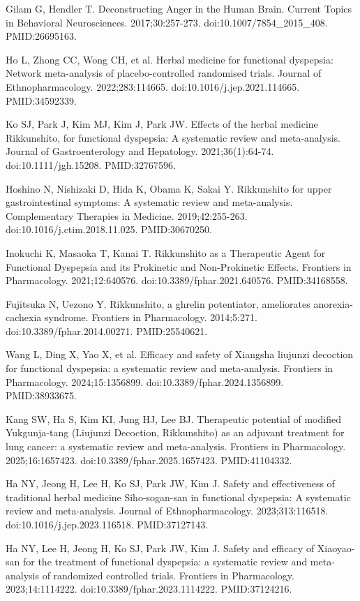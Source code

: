 \documentclass[12pt,oneside]{book}
\newcommand{\reff}[2]{\par\hangindent=7mm\hangafter=1\noindent[#1]\hspace{2mm}#2\par}
\begin{document}
\reff{26}{Gilam G, Hendler T. Deconstructing Anger in the Human Brain. Current Topics in Behavioral Neurosciences. 2017;30:257-273. doi:10.1007/7854\_2015\_408. PMID:26695163.}

\reff{27}{Ho L, Zhong CC, Wong CH, et al. Herbal medicine for functional dyspepsia: Network meta-analysis of placebo-controlled randomised trials. Journal of Ethnopharmacology. 2022;283:114665. doi:10.1016/j.jep.2021.114665. PMID:34592339.}

\reff{28}{Ko SJ, Park J, Kim MJ, Kim J, Park JW. Effects of the herbal medicine Rikkunshito, for functional dyspepsia: A systematic review and meta-analysis. Journal of Gastroenterology and Hepatology. 2021;36(1):64-74. doi:10.1111/jgh.15208. PMID:32767596.}

\reff{29}{Hoshino N, Nishizaki D, Hida K, Obama K, Sakai Y. Rikkunshito for upper gastrointestinal symptoms: A systematic review and meta-analysis. Complementary Therapies in Medicine. 2019;42:255-263. doi:10.1016/j.ctim.2018.11.025. PMID:30670250.}

\reff{30}{Inokuchi K, Masaoka T, Kanai T. Rikkunshito as a Therapeutic Agent for Functional Dyspepsia and its Prokinetic and Non-Prokinetic Effects. Frontiers in Pharmacology. 2021;12:640576. doi:10.3389/fphar.2021.640576. PMID:34168558.}

\reff{31}{Fujitsuka N, Uezono Y. Rikkunshito, a ghrelin potentiator, ameliorates anorexia-cachexia syndrome. Frontiers in Pharmacology. 2014;5:271. doi:10.3389/fphar.2014.00271. PMID:25540621.}

\reff{32}{Wang L, Ding X, Yao X, et al. Efficacy and safety of Xiangsha liujunzi decoction for functional dyspepsia: a systematic review and meta-analysis. Frontiers in Pharmacology. 2024;15:1356899. doi:10.3389/fphar.2024.1356899. PMID:38933675.}

\reff{33}{Kang SW, Ha S, Kim KI, Jung HJ, Lee BJ. Therapeutic potential of modified Yukgunja-tang (Liujunzi Decoction, Rikkunshito) as an adjuvant treatment for lung cancer: a systematic review and meta-analysis. Frontiers in Pharmacology. 2025;16:1657423. doi:10.3389/fphar.2025.1657423. PMID:41104332.}

\reff{34}{Ha NY, Jeong H, Lee H, Ko SJ, Park JW, Kim J. Safety and effectiveness of traditional herbal medicine Siho-sogan-san in functional dyspepsia: A systematic review and meta-analysis. Journal of Ethnopharmacology. 2023;313:116518. doi:10.1016/j.jep.2023.116518. PMID:37127143.}

\reff{35}{Ha NY, Lee H, Jeong H, Ko SJ, Park JW, Kim J. Safety and efficacy of Xiaoyao-san for the treatment of functional dyspepsia: a systematic review and meta-analysis of randomized controlled trials. Frontiers in Pharmacology. 2023;14:1114222. doi:10.3389/fphar.2023.1114222. PMID:37124216.}
\end{document}
